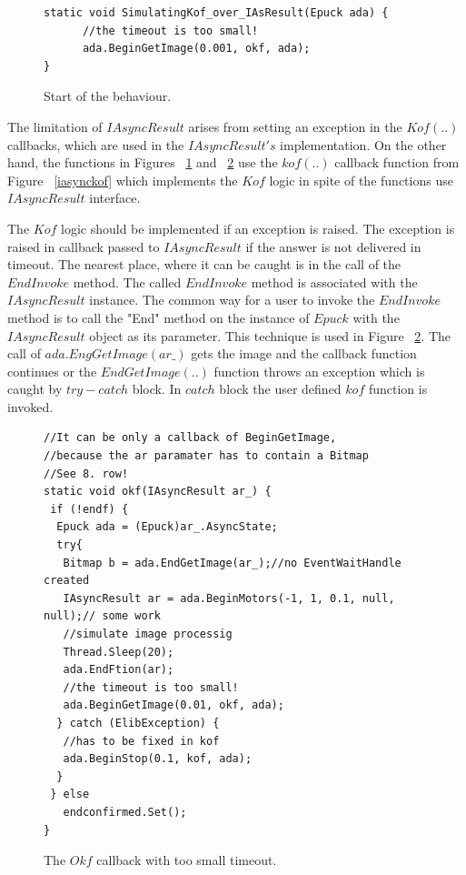 \documentclass[12pt,notitlepage]{report}
\begin{document}
\begin{figure}[!hbp]
\begin{lstlisting}
static void SimulatingKof_over_IAsResult(Epuck ada) {
      //the timeout is too small!
      ada.BeginGetImage(0.001, okf, ada);
}
\end{lstlisting}
\caption{Start of the behaviour.}
\label{c:start}
\end{figure}

	The limitation of $IAsyncResult$ arises from setting an exception in the $Kof(..)$ callbacks,
	which are used in the $IAsyncResult's$ implementation.
	On the other hand, the functions in Figures ~\ref{c:start} and ~\ref{c:okfsim} use the $kof(..)$ callback function
	from Figure ~\ref{iasynckof} 
	which implements the $Kof$ logic in spite of the functions use $IAsyncResult$ interface.

	The $Kof$ logic should be implemented if an exception is raised. 
	The exception is raised in callback passed to $IAsyncResult$ if the answer is not delivered in timeout. 
	The nearest place, where it can be caught is in the call of the $EndInvoke$ method.
	The called $EndInvoke$ method is associated with the $IAsyncResult$ instance. 
	The common way for a user to invoke the $EndInvoke$ method is to call the "End" method 
	on the instance of $Epuck$ with the $IAsyncResult$ object as its parameter. 
	This technique is used in Figure ~\ref{c:okfsim}.
	The call of $ada.EngGetImage(ar\_)$ gets the image and the callback function continues
	or the $EndGetImage(..)$ function throws an exception which is caught by $try-catch$ block.
	In $catch$ block the user defined $kof$ function is invoked.
	
\begin{figure}[!hbp]
\begin{lstlisting}
//It can be only a callback of BeginGetImage,
//because the ar paramater has to contain a Bitmap
//See 8. row!
static void okf(IAsyncResult ar_) {
 if (!endf) {
  Epuck ada = (Epuck)ar_.AsyncState;
  try{
   Bitmap b = ada.EndGetImage(ar_);//no EventWaitHandle created
   IAsyncResult ar = ada.BeginMotors(-1, 1, 0.1, null, null);// some work
   //simulate image processig
   Thread.Sleep(20);
   ada.EndFtion(ar);
   //the timeout is too small!
   ada.BeginGetImage(0.01, okf, ada);
  } catch (ElibException) {
   //has to be fixed in kof
   ada.BeginStop(0.1, kof, ada);
  }
 } else
   endconfirmed.Set();
}
\end{lstlisting}
\caption{The $Okf$ callback with too small timeout.}
\label{c:okfsim}
\end{figure}
\end{document}
